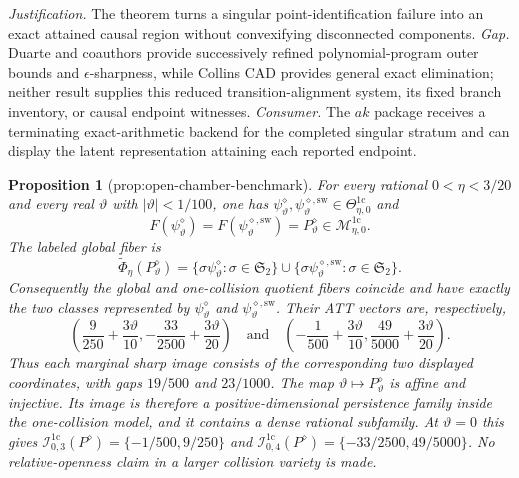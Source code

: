 \documentclass{article}
\newtheorem{proposition}{Proposition}
\begin{document}
\par\smallskip\noindent \textit{Justification.} The theorem turns a singular point-identification failure into an exact attained causal region without convexifying disconnected components. \textit{Gap.} Duarte and coauthors provide successively refined polynomial-program outer bounds and \(\epsilon\)-sharpness, while Collins CAD provides general exact elimination; neither result supplies this reduced transition-alignment system, its fixed branch inventory, or causal endpoint witnesses. \textit{Consumer.} The \(ak\) package receives a terminating exact-arithmetic backend for the completed singular stratum and can display the latent representation attaining each reported endpoint.

\begin{proposition}[prop:open-chamber-benchmark]\label{prop:open-chamber-benchmark}
For every rational \(0<\eta<3/20\) and every real \(\vartheta\) with \(|\vartheta|<1/100\), one has \(\psi^{\diamond}_{\vartheta},\psi^{\diamond,\mathrm{sw}}_{\vartheta}\in\Theta_{\eta,0}^{1\mathrm c}\) and
\[
F(\psi^{\diamond}_{\vartheta})=F(\psi^{\diamond,\mathrm{sw}}_{\vartheta})=P^{\diamond}_{\vartheta}\in\mathcal M_{\eta,0}^{1\mathrm c}.
\]
The labeled global fiber is
\[
\widetilde\Phi_\eta(P^{\diamond}_{\vartheta})
=\{\sigma\psi^{\diamond}_{\vartheta}:\sigma\in\mathfrak S_2\}
\cup\{\sigma\psi^{\diamond,\mathrm{sw}}_{\vartheta}:\sigma\in\mathfrak S_2\}.
\]
Consequently the global and one-collision quotient fibers coincide and have exactly the two classes represented by \(\psi^{\diamond}_{\vartheta}\) and \(\psi^{\diamond,\mathrm{sw}}_{\vartheta}\). Their ATT vectors are, respectively,
\[
\left(\frac{9}{250}+\frac{3\vartheta}{10},-\frac{33}{2500}+\frac{3\vartheta}{20}\right)
\quad\text{and}\quad
\left(-\frac{1}{500}+\frac{3\vartheta}{10},\frac{49}{5000}+\frac{3\vartheta}{20}\right).
\]
Thus each marginal sharp image consists of the corresponding two displayed coordinates, with gaps \(19/500\) and \(23/1000\). The map \(\vartheta\mapsto P^{\diamond}_{\vartheta}\) is affine and injective. Its image is therefore a positive-dimensional persistence family inside the one-collision model, and it contains a dense rational subfamily. At \(\vartheta=0\) this gives \(\mathcal I_{0,3}^{1\mathrm c}(P^{\diamond})=\{-1/500,9/250\}\) and \(\mathcal I_{0,4}^{1\mathrm c}(P^{\diamond})=\{-33/2500,49/5000\}\). No relative-openness claim in a larger collision variety is made.
\end{proposition}
\end{document}
